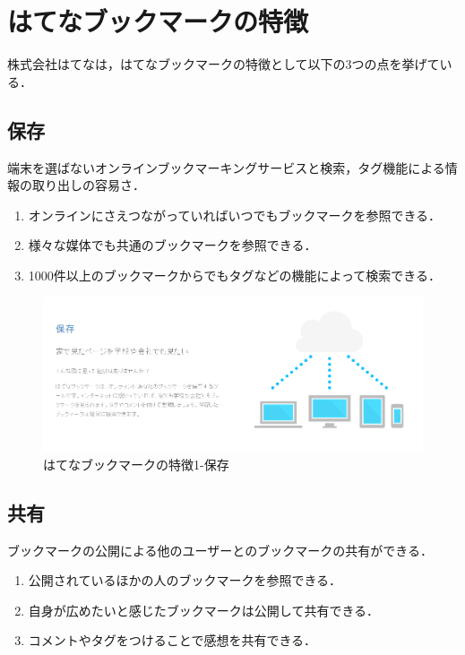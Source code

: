 \newpage

\section{はてなブックマークの特徴}
株式会社はてなは，はてなブックマークの特徴として以下の3つの点を挙げている\cite{hatena-3}\cite{hatena-future}．

\subsection{保存}
端末を選ばないオンラインブックマーキングサービスと検索，タグ機能による情報の取り出しの容易さ．

\begin{enumerate}
\item オンラインにさえつながっていればいつでもブックマークを参照できる．
\item 様々な媒体でも共通のブックマークを参照できる．
\item 1000件以上のブックマークからでもタグなどの機能によって検索できる．
\end{enumerate}

\begin{figure}[htb]
\centering
\includegraphics[width=13cm]{ho.PNG}
\caption{はてなブックマークの特徴1-保存}\label{hozon}
\end{figure}

\newpage


\subsection{共有}
ブックマークの公開による他のユーザーとのブックマークの共有ができる．


\begin{enumerate}
\item 公開されているほかの人のブックマークを参照できる．
\item 自身が広めたいと感じたブックマークは公開して共有できる．
\item コメントやタグをつけることで感想を共有できる．
\end{enumerate}


